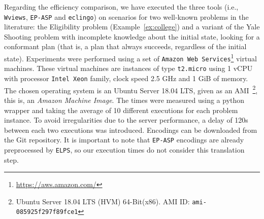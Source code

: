 \documentclass{new_tlp}
\def\eclingo{{\tt eclingo}}
\def\wviews{{\tt Wviews}}
\def\wviews{{\tt Wviews}}
\def\EPASP{{\tt EP-ASP}}
\begin{document}

Regarding the efficiency comparison, we have executed the three tools (i.e., \wviews, \EPASP{} and \eclingo) on scenarios for two well-known problems in the literature: the Eligibility problem (Example~\ref{ex:college}) and a variant of the Yale Shooting problem with incomplete knowledge about the initial state, looking for a conformant plan (that is, a plan that always succeeds, regardless of the initial state).
%
Experiments were performed using a set of \texttt{Amazon Web Services}\footnote{\url{https://aws.amazon.com/}} virtual machines. These virtual machines are instances of type \texttt{t2.micro} using 1 vCPU with processor {\tt Intel Xeon} family, clock speed 2.5 GHz and 1 GiB of memory.
The chosen operating system is an Ubuntu Server 18.04 LTS, given as an AMI~\footnote{Ubuntu Server 18.04 LTS (HVM) 64-Bit(x86). AMI ID: \texttt{ami-085925f297f89fce1}}, this is, an \emph{Amazon Machine Image}.
%
The times were measured using a python wrapper and taking the average of 10 different executions for each problem instance.
%
To avoid irregularities due to the server performance, a delay of 120s between each two executions was introduced.
%
%
Encodings can be downloaded from the Git repository.
It is important to note that \EPASP{} encodings are already preprocessed by {\tt ELPS}, so our execution times do not consider this translation step.
\end{document}
